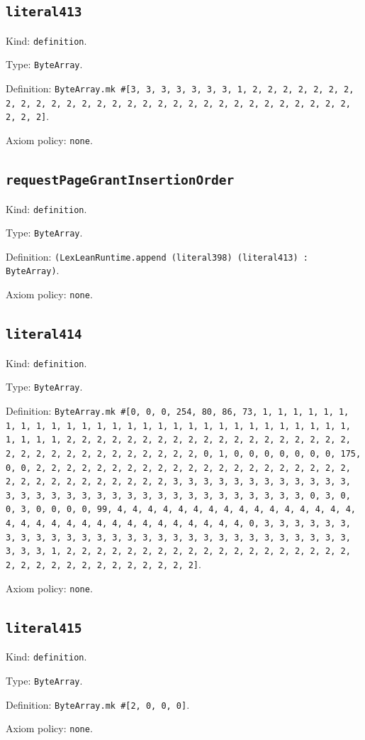 \documentclass[11pt]{article}
\begin{document}
\subsection*{\texttt{literal413}}
\noindent Kind: \texttt{definition}.\par
\noindent Type: \texttt{ByteArray}.\par
\noindent Definition: \texttt{ByteArray.mk \#[3, 3, 3, 3, 3, 3, 3, 1, 2, 2, 2, 2, 2, 2, 2, 2, 2, 2, 2, 2, 2, 2, 2, 2, 2, 2, 2, 2, 2, 2, 2, 2, 2, 2, 2, 2, 2, 2, 2, 2, 2]}.\par
\noindent Axiom policy: \texttt{none}.\par
\subsection*{\texttt{requestPageGrantInsertionOrder}}
\noindent Kind: \texttt{definition}.\par
\noindent Type: \texttt{ByteArray}.\par
\noindent Definition: \texttt{(LexLeanRuntime.append (literal398) (literal413) : ByteArray)}.\par
\noindent Axiom policy: \texttt{none}.\par
\subsection*{\texttt{literal414}}
\noindent Kind: \texttt{definition}.\par
\noindent Type: \texttt{ByteArray}.\par
\noindent Definition: \texttt{ByteArray.mk \#[0, 0, 0, 254, 80, 86, 73, 1, 1, 1, 1, 1, 1, 1, 1, 1, 1, 1, 1, 1, 1, 1, 1, 1, 1, 1, 1, 1, 1, 1, 1, 1, 1, 1, 1, 1, 1, 1, 1, 1, 2, 2, 2, 2, 2, 2, 2, 2, 2, 2, 2, 2, 2, 2, 2, 2, 2, 2, 2, 2, 2, 2, 2, 2, 2, 2, 2, 2, 2, 2, 2, 2, 0, 1, 0, 0, 0, 0, 0, 0, 0, 175, 0, 0, 2, 2, 2, 2, 2, 2, 2, 2, 2, 2, 2, 2, 2, 2, 2, 2, 2, 2, 2, 2, 2, 2, 2, 2, 2, 2, 2, 2, 2, 2, 2, 2, 3, 3, 3, 3, 3, 3, 3, 3, 3, 3, 3, 3, 3, 3, 3, 3, 3, 3, 3, 3, 3, 3, 3, 3, 3, 3, 3, 3, 3, 3, 3, 3, 0, 3, 0, 0, 3, 0, 0, 0, 0, 99, 4, 4, 4, 4, 4, 4, 4, 4, 4, 4, 4, 4, 4, 4, 4, 4, 4, 4, 4, 4, 4, 4, 4, 4, 4, 4, 4, 4, 4, 4, 4, 4, 0, 3, 3, 3, 3, 3, 3, 3, 3, 3, 3, 3, 3, 3, 3, 3, 3, 3, 3, 3, 3, 3, 3, 3, 3, 3, 3, 3, 3, 3, 3, 3, 3, 1, 2, 2, 2, 2, 2, 2, 2, 2, 2, 2, 2, 2, 2, 2, 2, 2, 2, 2, 2, 2, 2, 2, 2, 2, 2, 2, 2, 2, 2, 2, 2, 2]}.\par
\noindent Axiom policy: \texttt{none}.\par
\subsection*{\texttt{literal415}}
\noindent Kind: \texttt{definition}.\par
\noindent Type: \texttt{ByteArray}.\par
\noindent Definition: \texttt{ByteArray.mk \#[2, 0, 0, 0]}.\par
\noindent Axiom policy: \texttt{none}.\par
\end{document}
